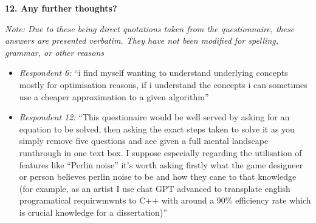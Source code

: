 \textbf{12. Any further thoughts?}

\textit{Note: Due to these being direct quotations taken from the questionnaire, these answers are presented verbatim. They have not been modified for spelling, grammar, or other reasons}

\begin{itemize}
    \item \textit{Respondent 6:} ``i find myself wanting to understand underlying concepts mostly for optimisation reasons, if i understand the concepts i can sometimes use a cheaper approximation to a given algorithm''
    \item \textit{Respondent 12:} ``This questionaire would be well served by asking for an equation to be solved, then asking the exact steps taken to solve it as you simply remove five questions and aee given a full mental landscape runthrough in one text box. I suppose especially regarding the utilisation of features like “Perlin noise” it’s worth asking firstly what the game designeer or person believes perlin noise to be and how they cane to that knowledge (for example, as an artist I use chat GPT advanced to transplate english programatical requirwmwnts to C++ with around a 90\% efficiency rate which is crucial knowledge for a dissertation)''
\end{itemize}


